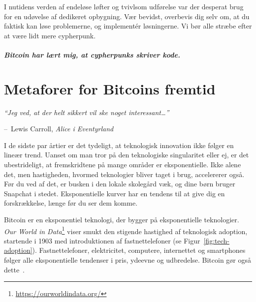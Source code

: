 \documentclass[paper=6in:9in,pagesize=pdftex,headinclude=on,footinclude=on,12pt]{scrbook}
\makeatletter
\newenvironment{chapquote}[2][4em]{\setlength{\@tempdima}{#1}%
   \def\chapquote@author{#2}%
   \parshape 1 \@tempdima \dimexpr\textwidth-2\@tempdima\relax%
   \itshape}{\par\normalfont\hfill--\ \chapquote@author\hspace*{\@tempdima}\par\bigskip}
\makeatother
\begin{document}
I nutidens verden af endeløse løfter og tvivlsom udførelse var der desperat brug for en udøvelse af dedikeret opbygning. Vær bevidst, overbevis dig selv om, at du faktisk kan løse problemerne, og implement\'er løsningerne. Vi bør alle stræbe efter at være lidt mere cypherpunk.\paragraph{Bitcoin har lært mig, at cypherpunks skriver kode.}%
%
%
%
%

\chapter{Metaforer for Bitcoins fremtid}
\label{les:21}

\begin{chapquote}{Lewis Carroll, \textit{Alice i Eventyrland}}
\enquote{Jeg ved, at der helt sikkert vil ske noget interessant\ldots}
\end{chapquote}

I de sidste par årtier er det tydeligt, at teknologisk innovation ikke følger en lineær trend. Uanset om man tror på den teknologiske singularitet eller ej, er det ubestrideligt, at fremskridtene på mange områder er eksponentielle. Ikke alene det, men hastigheden, hvormed teknologier bliver taget i brug, accelererer også. Før du ved af det, er busken i den lokale skolegård væk, og dine børn bruger Snapchat i stedet. Eksponentielle kurver har en tendens til at give dig en forskrækkelse, længe før du ser dem komme.

Bitcoin er en eksponentiel teknologi, der bygger på eksponentielle teknologier. \textit{Our World in Data}\footnote{\url{https://ourworldindata.org/}} viser smukt den stigende hastighed af teknologisk adoption, startende i 1903 med introduktionen af fastnettelefoner (se Figur~\ref{fig:tech-adoption}). Fastnettelefoner, elektricitet, computere, internettet og smartphones følger alle eksponentielle tendenser i pris, ydeevne og udbredelse. Bitcoin gør også dette~\cite{tech-adoption}.
\end{document}
